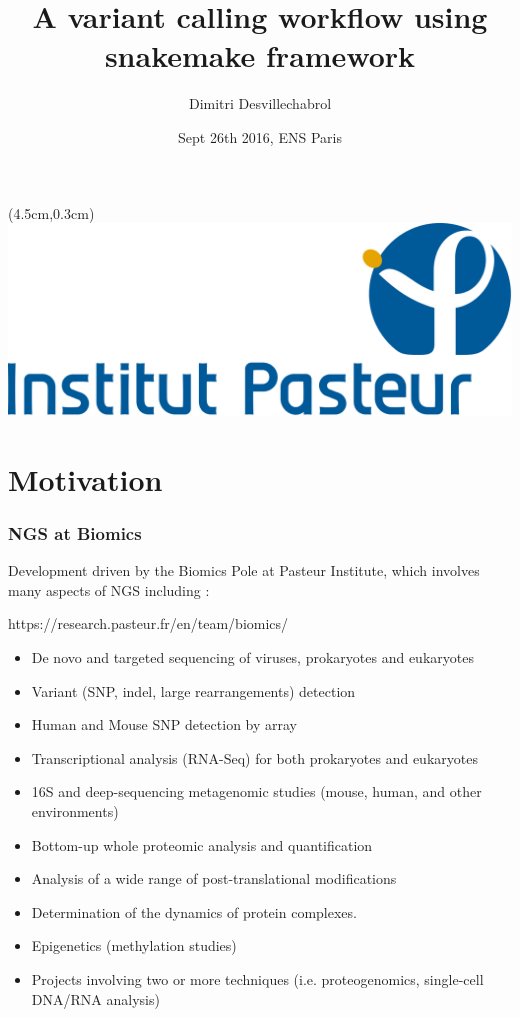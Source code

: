 \documentclass{beamer}
\title{A variant calling workflow using snakemake framework}
\author[T.Cokelaer \& D.Desvillechabrol]{Dimitri Desvillechabrol}
\institute{Institut Pasteur}
\date{Sept 26th 2016, ENS Paris}
\begin{document}

\begin{frame}[plain]
    \titlepage
    \begin{textblock*}{5cm}(4.5cm,0.3cm)
        \includegraphics[scale=0.09]{images/Institut_Pasteur.png}
    \end{textblock*}
\end{frame}


\section{Motivation}

\begin{frame}
 \frametitle{NGS at Biomics}
 
 Development driven by the Biomics Pole at Pasteur Institute, which involves
 many aspects of NGS including :
 
 \tiny
 \begin{block}{https://research.pasteur.fr/en/team/biomics/}
  \begin{itemize}
  \item De novo and targeted sequencing of viruses, prokaryotes and eukaryotes
  \item Variant (SNP, indel, large rearrangements) detection
  \item Human and Mouse SNP detection by array
  \item Transcriptional analysis (RNA-Seq) for both prokaryotes and eukaryotes
  \item 16S and deep-sequencing metagenomic studies (mouse, human, and other environments)
  \item Bottom-up whole proteomic analysis and quantification
  \item Analysis of a wide range of post-translational modifications
  \item Determination of the dynamics of protein complexes.
  \item Epigenetics (methylation studies)
  \item Projects involving two or more techniques (i.e. proteogenomics, single-cell DNA/RNA analysis)
  \end{itemize}
 \end{block}
 \small 
\end{frame}
\end{document}
